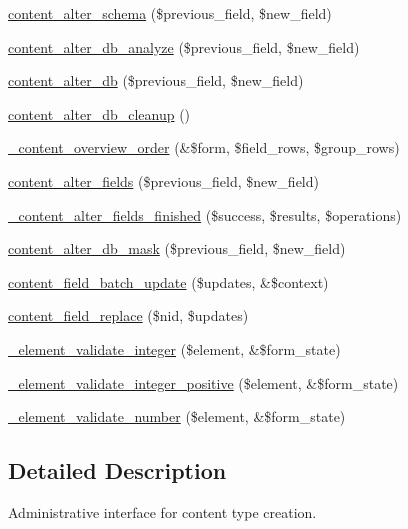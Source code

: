 \begin{CompactItemize}
\item 
\hyperlink{content_8admin_8inc_5bd91e396b908f6bc2d48f64925bf4d5}{content\_\-alter\_\-schema} (\$previous\_\-field, \$new\_\-field)
\item 
\hyperlink{content_8admin_8inc_3f2d33aff98deebf0ba30119ac7aeea8}{content\_\-alter\_\-db\_\-analyze} (\$previous\_\-field, \$new\_\-field)
\item 
\hyperlink{content_8admin_8inc_0ff88199fd38c8a5b07f76aa3f0086a0}{content\_\-alter\_\-db} (\$previous\_\-field, \$new\_\-field)
\item 
\hyperlink{content_8admin_8inc_6dc8d87b2a3af1ccff3e9037c228f313}{content\_\-alter\_\-db\_\-cleanup} ()
\item 
\hyperlink{content_8admin_8inc_cf99115634a38f199e206785e19b2224}{\_\-content\_\-overview\_\-order} (\&\$form, \$field\_\-rows, \$group\_\-rows)
\item 
\hyperlink{content_8admin_8inc_e26b077ad5c1a9d5b0dc25a9e7a1d38b}{content\_\-alter\_\-fields} (\$previous\_\-field, \$new\_\-field)
\item 
\hyperlink{content_8admin_8inc_68088502ff18bde0ce1e9b855b4e3c6d}{\_\-content\_\-alter\_\-fields\_\-finished} (\$success, \$results, \$operations)
\item 
\hyperlink{content_8admin_8inc_479029a53f7baaaa778379e3ba5082f2}{content\_\-alter\_\-db\_\-mask} (\$previous\_\-field, \$new\_\-field)
\item 
\hyperlink{content_8admin_8inc_d1be9f73d417ae00aab3a76a98adfc9d}{content\_\-field\_\-batch\_\-update} (\$updates, \&\$context)
\item 
\hyperlink{content_8admin_8inc_5dee1d4c64d47ed239224c9ec9a8b798}{content\_\-field\_\-replace} (\$nid, \$updates)
\item 
\hyperlink{content_8admin_8inc_f34002ccec2a5ae0697cc23cac5cf9f1}{\_\-element\_\-validate\_\-integer} (\$element, \&\$form\_\-state)
\item 
\hyperlink{content_8admin_8inc_8a204417f7ec4289d828b223afa22c57}{\_\-element\_\-validate\_\-integer\_\-positive} (\$element, \&\$form\_\-state)
\item 
\hyperlink{content_8admin_8inc_95595f737604fea8bffc695d064f2b67}{\_\-element\_\-validate\_\-number} (\$element, \&\$form\_\-state)
\end{CompactItemize}


\subsection{Detailed Description}
Administrative interface for content type creation. 

